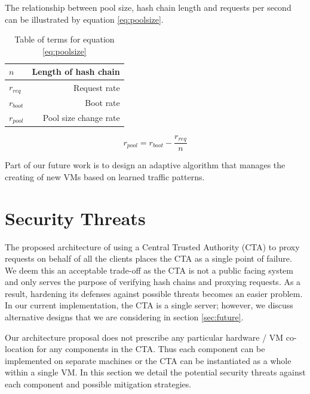 \documentclass[a4paper,twoside]{article}
\begin{document}
The relationship between pool size, hash chain length and requests per second can be illustrated by equation \ref{eq:poolsize}.  

\begin{table}
	

\begin{center}
	\begin{tabular}{ | l | r |}
		\hline
		$n$ & Length of hash chain \\ \hline 
		$r_{req}$ & Request rate  \\ \hline
		$r_{boot}$ & Boot rate  \\ \hline
		$r_{pool}$ & Pool size change rate\\
		\hline
		
	\end{tabular}
	
	\label{tab:terms}
\end{center}
\caption{Table of terms for equation \ref{eq:poolsize}}
\end{table}

\begin{equation} 
 r_{pool} = r_{boot} - \frac{r_{req}}{n}
 \label{eq:poolsize}
\end{equation}




Part of our future work is to design an adaptive algorithm that manages the creating of new VMs based on learned traffic patterns.

\section{Security Threats}

The proposed architecture of using a Central Trusted Authority (CTA) to proxy requests on behalf of all the clients places the CTA as a single point of failure. We deem this an acceptable trade-off as the CTA is not a public facing system and only serves the purpose of verifying hash chains and proxying requests.  As a result, hardening its defenses against possible threats becomes an easier problem.  In our current implementation, the CTA is a single server; however, we discuss alternative designs that we are considering in section \ref{sec:future}.

Our architecture proposal does not prescribe any particular hardware / VM co-location for any components in the CTA. Thus each component can be implemented on separate machines or the CTA can be instantiated as a whole within a single VM. In this section we detail the potential security threats against each component and possible mitigation strategies.
\end{document}
